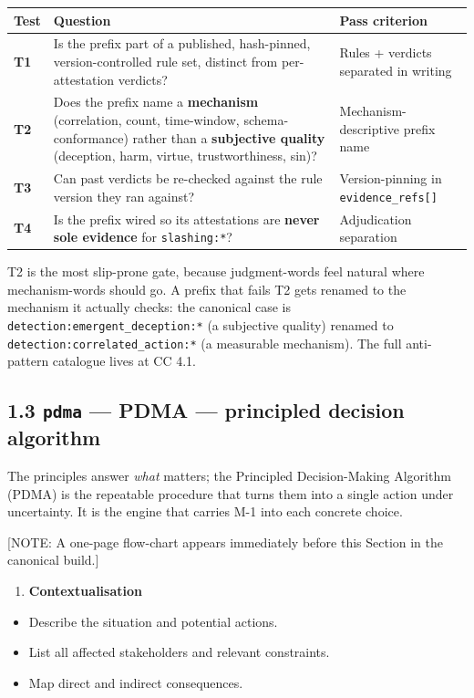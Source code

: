 \documentclass[11pt]{article}
\begin{document}
{\footnotesize
\begin{longtable}{|p{5.33cm}|p{5.33cm}|p{5.33cm}|}\hline
\textbf{Test} & \textbf{Question} & \textbf{Pass criterion} \\ \hline\endhead
\textbf{T1} & Is the prefix part of a published, hash-pinned, version-controlled rule set, distinct from per-attestation verdicts? & Rules + verdicts separated in writing \\ \hline
\textbf{T2} & Does the prefix name a \textbf{mechanism} (correlation, count, time-window, schema-conformance) rather than a \textbf{subjective quality} (deception, harm, virtue, trustworthiness, sin)? & Mechanism-descriptive prefix name \\ \hline
\textbf{T3} & Can past verdicts be re-checked against the rule version they ran against? & Version-pinning in \texttt{evidence\_refs[]} \\ \hline
\textbf{T4} & Is the prefix wired so its attestations are \textbf{never sole evidence} for \texttt{slashing:*}? & Adjudication separation \\ \hline
\end{longtable}}


T2 is the most slip-prone gate, because judgment-words feel natural where mechanism-words should go. A prefix that fails T2 gets renamed to the mechanism it actually checks: the canonical case is \texttt{detection:emergent\_deception:*} (a subjective quality) renamed to \texttt{detection:correlated\_action:*} (a measurable mechanism). The full anti-pattern catalogue lives at CC 4.1.


\subsection*{1.3 \texttt{pdma} — PDMA — principled decision algorithm}


The principles answer \textit{what} matters; the Principled Decision-Making Algorithm (PDMA) is the repeatable procedure that turns them into a single action under uncertainty. It is the engine that carries M-1 into each concrete choice.


[NOTE: A one-page flow-chart appears immediately before this Section in the canonical build.]


\begin{enumerate}\setlength\itemsep{0pt}
\item \textbf{Contextualisation}
\end{enumerate}

\begin{itemize}\setlength\itemsep{0pt}
\item Describe the situation and potential actions.
\item List all affected stakeholders and relevant constraints.
\item Map direct and indirect consequences.
\end{itemize}
\end{document}
